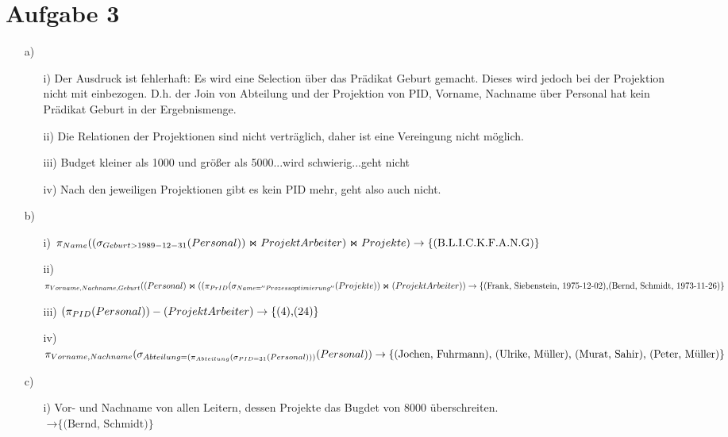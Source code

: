 \documentclass[a4paper,10pt,]{scrartcl}
\begin{document}
\section*{Aufgabe 3}
\begin{enumerate}
 \item[a)]
 \begin{enumerate}
  \item[i)] Der Ausdruck ist fehlerhaft: Es wird eine Selection über das Prädikat Geburt gemacht. Dieses wird jedoch bei der Projektion nicht mit einbezogen. D.h. der Join von Abteilung und der Projektion von PID, Vorname, Nachname über Personal hat kein Prädikat Geburt in der Ergebnismenge.
  \item[ii)] Die Relationen der Projektionen sind nicht verträglich, daher ist eine Vereingung nicht möglich.
  \item[iii)] Budget kleiner als 1000 und größer als 5000...wird schwierig...geht nicht
  \item[iv)] Nach den jeweiligen Projektionen gibt es kein PID mehr, geht also auch nicht.
 \end{enumerate}

 \item[b)]
 \begin{enumerate}
  \item[i)] $\pi_{Name} ((\sigma_{Geburt>1989-12-31}(Personal)) \Join ProjektArbeiter ) \Join Projekte )\\\rightarrow \text{\{(B.L.I.C.K.F.A.N.G)\}}$
  \item[ii)] $\pi_{Vorname, Nachname, Geburt}((Personal) \Join ((\pi_{PrID}(\sigma_{Name=''Prozessoptimierung''}(Projekte)) \Join (ProjektArbeiter))\\
  \rightarrow \text{\{(Frank, Siebenstein, 1975-12-02),(Bernd, Schmidt, 1973-11-26)\}}$
  \item[iii)] %
  $(\pi_{PID}(Personal)) - (ProjektArbeiter) \\
  \rightarrow \text{\{(4),(24)\}}$
  \item[iv)] %
  $\pi_{Vorname, Nachname}(\sigma_{Abteilung=(\pi_{Abteilung}(\sigma_{PID=31}(Personal)))}(Personal)) \\
  \rightarrow \text{\{(Jochen, Fuhrmann), (Ulrike, Müller), (Murat, Sahir), (Peter, Müller)\}}$
 \end{enumerate}

 \item[c)]
 \begin{enumerate}
  \item[i)] Vor- und Nachname von allen Leitern, dessen Projekte das Bugdet von 8000 überschreiten.\\
  $\rightarrow \text{\{(Bernd, Schmidt)\}}$
 

\end{enumerate}
\end{enumerate}
\end{document}
